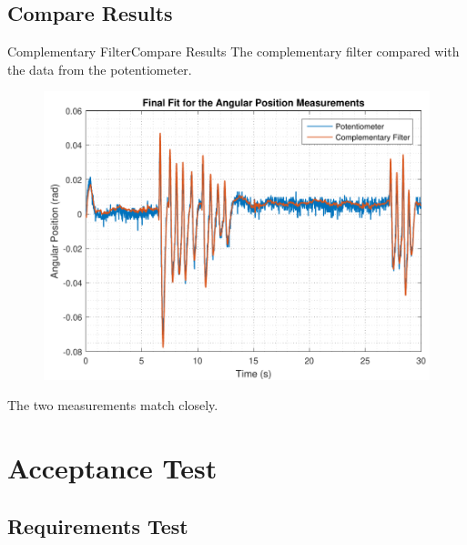\subsection{Compare Results}
\begin{frame}{Complementary Filter}{Compare Results}
The complementary filter compared with the data from the potentiometer.
	\begin{figure}
		\centering
		\includegraphics[scale=0.5]{Pictures/filterSensTool.pdf}
	\end{figure}
The two measurements match closely.
\end{frame}
\section{Acceptance Test}

\subsection{Requirements Test}

